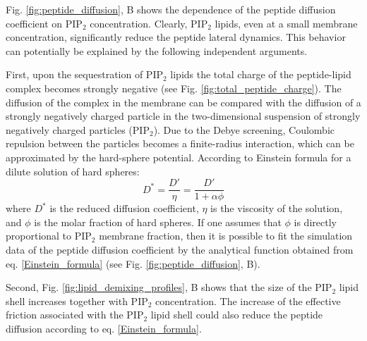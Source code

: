 Fig. \ref{fig:peptide_diffusion}, B shows the dependence of the peptide diffusion coefficient on PIP$_2$ concentration. Clearly, PIP$_2$ lipids, even at a small membrane concentration, significantly reduce the peptide lateral dynamics. This behavior can potentially be explained by the following independent arguments.

First, upon the sequestration of PIP$_2$ lipids the total charge of the peptide-lipid complex becomes strongly negative (see Fig. \ref{fig:total_peptide_charge}). The diffusion of the complex in the membrane can be compared with the diffusion of a strongly negatively charged particle in the two-dimensional suspension of strongly negatively charged particles (PIP$_2$). Due to the Debye screening, Coulombic repulsion between the particles becomes a finite-radius interaction, which can be approximated by the hard-sphere potential. According to Einstein formula for a dilute solution of hard spheres:
\begin{equation}
\label{Einstein_formula}
 D^*=\frac{D'}{\eta} = \frac{D'}{1+\alpha\phi}
\end{equation}
where $D^*$ is the reduced diffusion coefficient, $\eta$ is the viscosity of the solution, and $\phi$ is the molar fraction of hard spheres. If one assumes that $\phi$ is directly proportional to PIP$_2$ membrane fraction, then it is possible to fit the simulation data of the peptide diffusion coefficient by the analytical function obtained from eq. \eqref{Einstein_formula} (see Fig. \ref{fig:peptide_diffusion}, B).

Second, Fig. \ref{fig:lipid_demixing_profiles}, B shows that the size of the PIP$_2$ lipid shell increases together with PIP$_2$ concentration. The increase of the effective friction associated with the PIP$_2$ lipid shell could also reduce the peptide diffusion according to eq. \eqref{Einstein_formula}.



